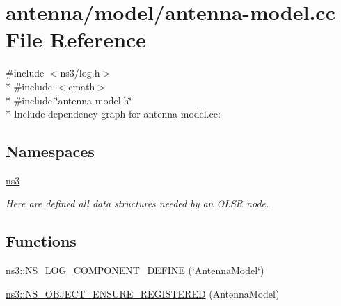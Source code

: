 \hypertarget{antenna-model_8cc}{}\section{antenna/model/antenna-\/model.cc File Reference}
\label{antenna-model_8cc}
{\ttfamily \#include $<$ns3/log.\+h$>$}\\*
{\ttfamily \#include $<$cmath$>$}\\*
{\ttfamily \#include \char`\"{}antenna-\/model.\+h\char`\"{}}\\*
Include dependency graph for antenna-\/model.cc\+:
\subsection*{Namespaces}
\begin{DoxyCompactItemize}
\item 
 \hyperlink{namespacens3}{ns3}
\begin{DoxyCompactList}\small\item\em Here are defined all data structures needed by an O\+L\+SR node. \end{DoxyCompactList}\end{DoxyCompactItemize}
\subsection*{Functions}
\begin{DoxyCompactItemize}
\item 
\hyperlink{namespacens3_a46db2708c8f1520ad49ac09efa9fe5bc}{ns3\+::\+N\+S\+\_\+\+L\+O\+G\+\_\+\+C\+O\+M\+P\+O\+N\+E\+N\+T\+\_\+\+D\+E\+F\+I\+NE} (\char`\"{}Antenna\+Model\char`\"{})
\item 
\hyperlink{namespacens3_ac633cbd86ee5879afd4312a843a9ff8c}{ns3\+::\+N\+S\+\_\+\+O\+B\+J\+E\+C\+T\+\_\+\+E\+N\+S\+U\+R\+E\+\_\+\+R\+E\+G\+I\+S\+T\+E\+R\+ED} (Antenna\+Model)
\end{DoxyCompactItemize}

